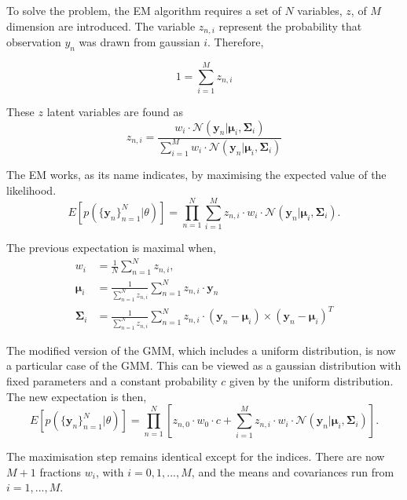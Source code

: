 To solve the problem, the EM algorithm requires  a set of $N$ variables, $z$, of $M$ dimension are introduced. The variable $z_{n,i}$ represent the probability that observation $y_n$ was drawn from gaussian $i$. Therefore,

\begin{equation}
1=\sum_{i=1}^M z_{n,i}
\end{equation}

These $z$ latent variables are found as
\begin{equation}
z_{n,i}= \frac{w_i\cdot \mathcal{N}(\mathbf{y}_n|\boldsymbol{\mu}_i,\boldsymbol{\Sigma}_i)}{\sum_{i=1}^M w_i\cdot \mathcal{N}(\mathbf{y}_n|\boldsymbol{\mu}_i,\boldsymbol{\Sigma}_i)}
\end{equation}

The EM works, as its name indicates, by maximising the expected value of the likelihood.
\begin{equation}
E[p(\{\mathbf{y}_n\}_{n=1}^N|\theta)]=\prod_{n=1}^N {\sum_{i=1} ^M {z_{n,i}\cdot w_i\cdot \mathcal{N}(\mathbf{y}_n|\boldsymbol{\mu}_i,\boldsymbol{\Sigma}_i)}}.
\end{equation}

The previous expectation is maximal when,
\begin{align}
w_i &= \frac{1}{N} \sum_{n=1}^N z_{n,i}, \\
\boldsymbol{\mu}_i &= \frac{1}{\sum_{n=1}^N z_{n,i}} \sum_{n=1}^N z_{n,i}\cdot \mathbf{y}_n\\
\boldsymbol{\Sigma}_i &= \frac{1}{\sum_{n=1}^N z_{n,i}} \sum_{n=1}^N z_{n,i}\cdot (\mathbf{y}_n - \boldsymbol{\mu}_i)\times(\mathbf{y}_n-\boldsymbol{\mu}_i)^T
\end{align}

The modified version of the GMM, which includes a uniform distribution, is now a particular case of the GMM. This can be viewed as a gaussian distribution with fixed parameters and a constant probability $c$ given by the uniform distribution. The new expectation is then,
\begin{equation}
E[p(\{\mathbf{y}_n\}_{n=1}^N|\theta)]=\prod_{n=1}^N {\left[z_{n,0}\cdot w_0 \cdot c + \sum_{i=1} ^M {z_{n,i}\cdot w_i\cdot \mathcal{N}(\mathbf{y}_n|\boldsymbol{\mu}_i,\boldsymbol{\Sigma}_i)}\right]}.
\end{equation}

The maximisation step remains identical except for the indices. There are now $M+1$ fractions $w_i$, with $i=0,1,...,M$, and the means and covariances run from $i=1,...,M$.

